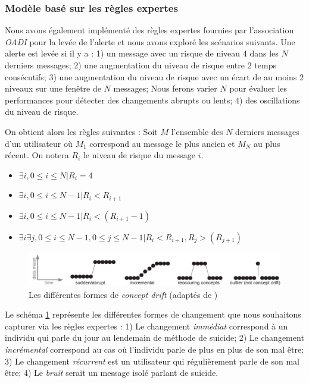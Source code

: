 \subsubsection{Modèle basé sur les règles expertes}\label{regles}

Nous avons également implémenté des règles expertes fournies par l'association \textit{OADI} pour la levée de l'alerte et nous avons exploré les scénarios suivants. Une alerte est levée si il y a : 
1) un message avec un risque  de niveau 4 dans les $N$ derniers messages;
2)  une augmentation du niveau de risque entre 2 temps consécutifs;
3)  une augmentation du niveau de risque avec un écart de au moins 2 niveaux sur une fenêtre de $N$ messages; Nous ferons varier $N$ pour évaluer les performances pour détecter des changements abrupts ou lents;
4)  des oscillations du niveau de risque.

On obtient alors les règles suivantes : Soit $M$ l'ensemble des $N$ derniers messages d'un utilisateur où $M_1$ correspond au message le plus ancien et $M_N$ au plus récent. On notera $R_i$ le niveau de risque du message $i$.

%
%
\begin{itemize}
\item  $\exists i, 0\leq i \leq N | R_i = 4$
\item  $\exists i, 0\leq i \leq N-1 | R_i < R_{i+1}$
\item  $\exists i, 0\leq i \leq N-1 | R_i < (R_{i+1}-1)$
\item  $\exists i \exists j, 0\leq i \leq N-1, 0\leq j \leq N-1 | R_i < R_{i+1}, R_j > (R_{j+1})$
\end{itemize}

\begin{figure}[!h]
   \includegraphics[width=.95\textwidth]{imgs/types_concept_drift.png}
	\caption{\label{formes_cd} Les différentes formes de \emph{concept drift} (adaptés de \cite{Gama2014})}
\end{figure}

Le schéma \ref{formes_cd} représente les différentes formes de changement que nous souhaitons capturer via les règles expertes : 
1) Le changement \emph{immédiat} correspond à un individu qui parle du jour au lendemain de méthode de suicide;
2) Le changement \emph{incrémental} correspond au cas où l'individu parle de plus en plus de son mal être;
3) Le changement \emph{récurrent} est un utilisateur qui régulièrement parle de son mal être;
4) Le \emph{bruit} serait un message isolé parlant de suicide.